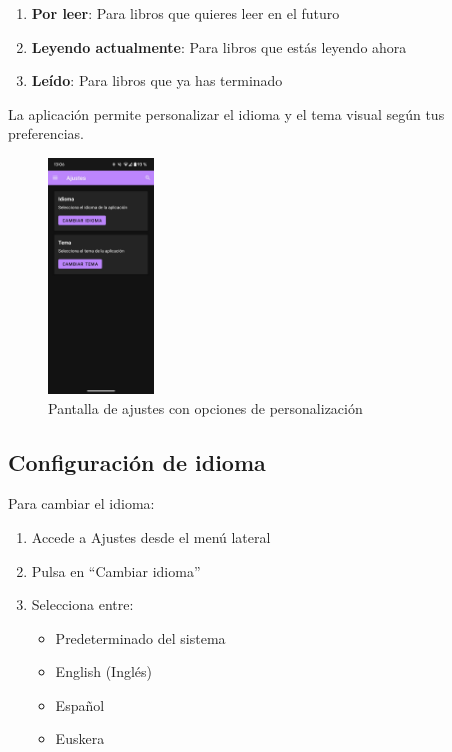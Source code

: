 \documentclass[a4paper,10pt]{report}
\begin{document}
      \begin{enumerate}
        \item \textbf{Por leer}: Para libros que quieres leer en el futuro
        \item \textbf{Leyendo actualmente}: Para libros que estás leyendo ahora
        \item \textbf{Leído}: Para libros que ya has terminado
      \end{enumerate}
    
    
    La aplicación permite personalizar el idioma y el tema visual según tus preferencias.
    
    \begin{figure}[H]
      \centering
      \includegraphics[width=0.25\textwidth]{.img/ajustes.png}
      \caption{Pantalla de ajustes con opciones de personalización}
      \label{fig:ajustes}
    \end{figure}
    
    \subsection{Configuración de idioma}
    
    Para cambiar el idioma:
    \begin{enumerate}
      \item Accede a Ajustes desde el menú lateral
      \item Pulsa en ``Cambiar idioma''
      \item Selecciona entre:
      \begin{itemize}
        \item Predeterminado del sistema
        \item English (Inglés)
        \item Español
        \item Euskera
      \end{itemize}
    \end{enumerate}
    
\end{document}
